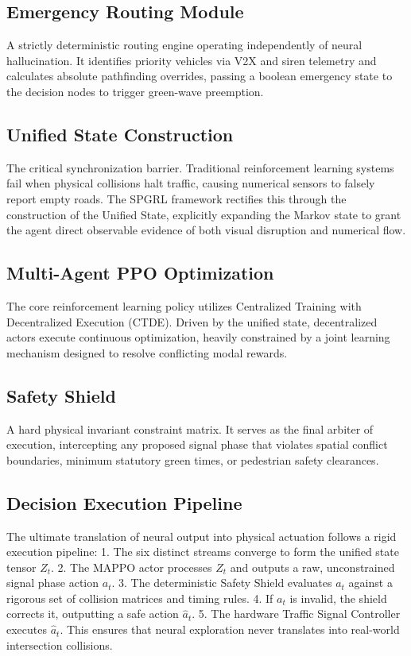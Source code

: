 \documentclass[journal]{IEEEtran}
\begin{document}
\subsection{Emergency Routing Module}
A strictly deterministic routing engine operating independently of neural hallucination. It identifies priority vehicles via V2X and siren telemetry and calculates absolute pathfinding overrides, passing a boolean emergency state to the decision nodes to trigger green-wave preemption.

\subsection{Unified State Construction}
The critical synchronization barrier. Traditional reinforcement learning systems fail when physical collisions halt traffic, causing numerical sensors to falsely report empty roads. The SPGRL framework rectifies this through the construction of the Unified State, explicitly expanding the Markov state to grant the agent direct observable evidence of both visual disruption and numerical flow.

\subsection{Multi-Agent PPO Optimization}
The core reinforcement learning policy utilizes Centralized Training with Decentralized Execution (CTDE). Driven by the unified state, decentralized actors execute continuous optimization, heavily constrained by a joint learning mechanism designed to resolve conflicting modal rewards.

\subsection{Safety Shield}
A hard physical invariant constraint matrix. It serves as the final arbiter of execution, intercepting any proposed signal phase that violates spatial conflict boundaries, minimum statutory green times, or pedestrian safety clearances.

\subsection{Decision Execution Pipeline}
The ultimate translation of neural output into physical actuation follows a rigid execution pipeline:
1. The six distinct streams converge to form the unified state tensor $Z_t$.
2. The MAPPO actor processes $Z_t$ and outputs a raw, unconstrained signal phase action $a_t$.
3. The deterministic Safety Shield evaluates $a_t$ against a rigorous set of collision matrices and timing rules.
4. If $a_t$ is invalid, the shield corrects it, outputting a safe action $\hat{a}_t$.
5. The hardware Traffic Signal Controller executes $\hat{a}_t$.
This ensures that neural exploration never translates into real-world intersection collisions.
\end{document}
